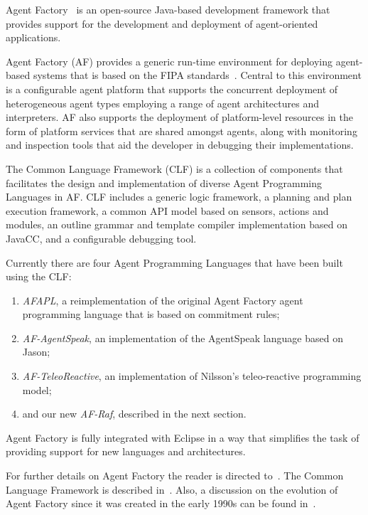 \documentclass[preprint]{sigplanconf} %
\theoremstyle{remark}
\begin{document}
Agent Factory~\cite{collier2002agent} is an open-source Java-based
development framework that provides support for the development and
deployment of agent-oriented applications.

Agent Factory (AF) provides a generic run-time environment for deploying
agent-based systems that is based on the FIPA standards~\cite{poslad2000fipa}.
Central to this environment is a configurable agent platform that supports the
concurrent deployment of heterogeneous agent types employing a range of agent
architectures and interpreters. AF also supports the deployment of
platform-level resources in the form of platform services that are shared
amongst agents, along with monitoring and inspection tools that aid the
developer in debugging their implementations. 

The Common Language Framework (CLF) is a collection of components that
facilitates the design and implementation of diverse Agent Programming
Languages in AF. CLF includes a generic logic framework, a planning and
plan execution framework, a common API model based on sensors, actions and
modules, an outline grammar and template compiler implementation based on
JavaCC, and a configurable debugging tool.

Currently there are four Agent Programming Languages that have been built
using the CLF: 
\begin{enumerate}

\item \textit{AFAPL}, a reimplementation of the original Agent Factory
agent programming language that is based on commitment rules;

\item \textit{AF-AgentSpeak}, an implementation of the AgentSpeak language based on Jason;

\item \textit{AF-TeleoReactive}, an implementation of Nilsson's teleo-reactive
programming model; 

\item and our new \textit{AF-Raf}, described in the next section.
\end{enumerate}

Agent Factory is fully integrated with Eclipse in a way that simplifies
the task of providing support for new languages and architectures.

For further details on Agent Factory the reader is directed
to~\cite{collier2009modeling}. The Common Language Framework is described
in~\cite{russell2011af}. Also, a discussion on the evolution of Agent Factory since it
was created in the early 1990s can be found in~\cite{muldoon2009towards}.
\end{document}
